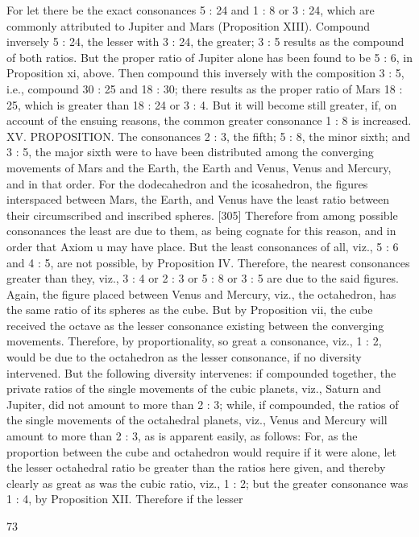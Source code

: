 \documentclass{article}
\begin{document}
For let there be the exact consonances 5 : 24 and 1 : 8 or 3 : 24, which are
commonly attributed to Jupiter and Mars (Proposition XIII). Compound
inversely 5 : 24, the lesser with 3 : 24, the greater; 3 : 5 results as the
compound of both ratios. But the proper ratio of Jupiter alone has been
found to be 5 : 6, in Proposition xi, above. Then compound this inversely
with the composition 3 : 5, i.e., compound 30 : 25 and 18 : 30; there
results as the proper ratio of Mars 18 : 25, which is greater than 18 : 24
or 3 : 4. But it will become still greater, if, on account of the ensuing
reasons, the common greater consonance 1 : 8 is increased.
XV. PROPOSITION. The consonances 2 : 3, the fifth; 5 : 8, the minor
sixth; and 3 : 5, the major sixth were to have been distributed among the
converging movements of Mars and the Earth, the Earth and Venus,
Venus and Mercury, and in that order.
For the dodecahedron and the icosahedron, the figures interspaced
between Mars, the Earth, and Venus have the least ratio between their
circumscribed and inscribed spheres. [305] Therefore from among
possible consonances the least are due to them, as being cognate for this
reason, and in order that Axiom u may have place. But the least
consonances of all, viz., 5 : 6 and 4 : 5, are not possible, by Proposition
IV. Therefore, the nearest consonances greater than they, viz., 3 : 4 or 2 :
3 or 5 : 8 or 3 : 5 are due to the said figures.
Again, the figure placed between Venus and Mercury, viz., the
octahedron, has the same ratio of its spheres as the cube. But by
Proposition vii, the cube received the octave as the lesser consonance
existing between the converging movements. Therefore, by
proportionality, so great a consonance, viz., 1 : 2, would be due to the
octahedron as the lesser consonance, if no diversity intervened. But the
following diversity intervenes: if compounded together, the private ratios
of the single movements of the cubic planets, viz., Saturn and Jupiter,
did not amount to more than 2 : 3; while, if compounded, the ratios of
the single movements of the octahedral planets, viz., Venus and Mercury
will amount to more than 2 : 3, as is apparent easily, as follows: For, as
the proportion between the cube and octahedron would require if it were
alone, let the lesser octahedral ratio be greater than the ratios here given,
and thereby clearly as great as was the cubic ratio, viz., 1 : 2; but the
greater consonance was 1 : 4, by Proposition XII. Therefore if the lesser


73
\end{document}

